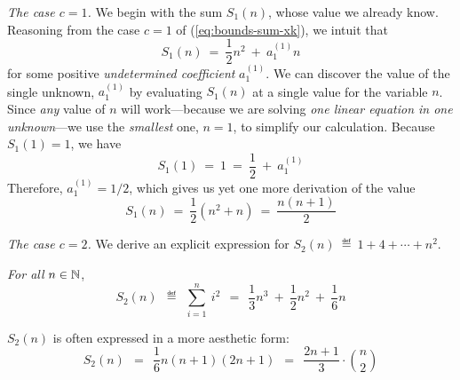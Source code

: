 \medskip

{\it The case $c=1$.}
%
We begin with the sum $S_1(n)$, whose value we already know.  Reasoning from the case $c=1$ of (\ref{eq:bounds-sum-xk}), we intuit that
\[ S_1(n) \ = \ \frac{1}{2} n^2 \ + \ a^{(1)}_1 n \]
for some positive {\it undetermined coefficient} $a^{(1)}_1$.  We can discover the value of the single unknown, $a^{(1)}_1$ by evaluating $S_1(n)$ at a single value for the variable $n$.  Since {\em any} value of $n$ will work---because we are solving {\em one linear equation in one unknown}---we use the {\em smallest} one, $n=1$, to simplify our calculation.  Because $S_1(1) = 1$, we have
\[ S_1(1) \ = \ 1 \ = \ \frac{1}{2} \ + \ a^{(1)}_1 \]
Therefore, $a^{(1)}_1 = 1/2$, which gives us yet one more derivation of the value
\[ S_1(n) \ = \ \frac{1}{2} \left( n^2 + n \right) \ = \  \frac{n(n+1)}{2} \]

\medskip

{\it The case $c=2$.}
%
We derive an explicit expression for $S_2(n) \ \eqdef \  1 + 4 + \cdots + n^2$.

\begin{prop}
\label{thm:summing-squares}
{\em For all} $n \in \mathbb{N}$,
\begin{equation}
\label{eq:sum-1-to-nsq}
S_2(n) \ \ \eqdef \ \ \sum_{i=1}^n \ i^2 
\ \ = \ \ \frac{1}{3} n^3 \ + \ \frac{1}{2} n^2 \ + \ \frac{1}{6} n
\end{equation}
\end{prop}

\noindent
$S_2(n)$ is often expressed in a more aesthetic form:
\[ S_2(n) \ \ = \ \
\frac{1}{6} n (n+1)(2n+1) \ \  = \ \
\frac{2n+1}{3} \cdot {n \choose 2}
\]

